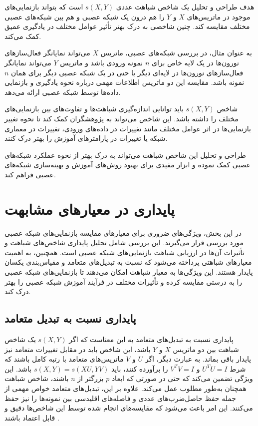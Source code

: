 هدف طراحی و تحلیل یک شاخص شباهت عددی \( s(X, Y) \) است که بتواند بازنمایی‌های%
موجود در ماتریس‌های \( X \) و \( Y \) را هم درون یک شبکه عصبی و هم بین شبکه‌های عصبی مختلف مقایسه کند. چنین شاخصی به درک بهتر تأثیر عوامل مختلف در یادگیری عمیق کمک می‌کند.

به عنوان مثال، در بررسی شبکه‌های عصبی، ماتریس \( X \) می‌تواند نمایانگر فعال‌سازهای%
نورون‌ها در یک لایه خاص برای \( n \) نمونه ورودی باشد و ماتریس \( Y \) می‌تواند نمایانگر فعال‌سازهای نورون‌ها در لایه‌ای دیگر یا حتی در یک شبکه عصبی دیگر برای همان \( n \) نمونه باشد. مقایسه این دو ماتریس اطلاعات مهمی درباره نحوه یادگیری و بازنمایی داده‌ها توسط شبکه عصبی ارائه می‌دهد.

شاخص \( s(X, Y) \) باید توانایی اندازه‌گیری شباهت‌ها و تفاوت‌های بین بازنمایی‌های مختلف را داشته باشد. این شاخص می‌تواند به پژوهشگران کمک کند تا نحوه تغییر بازنمایی‌ها در اثر عوامل مختلف مانند تغییرات در داده‌های ورودی، تغییرات در معماری شبکه یا تغییرات در پارامترهای آموزش را بهتر درک کنند.

طراحی و تحلیل این شاخص شباهت می‌تواند به درک بهتر از نحوه عملکرد شبکه‌های عصبی کمک نموده و ابزار مفیدی برای بهبود روش‌های آموزش و بهینه‌سازی شبکه‌های عصبی فراهم کند.


\section{
	پایداری در معیارهای مشابهت
}
در این بخش، ویژگی‌های ضروری برای معیارهای مقایسه بازنمایی‌های شبکه عصبی مورد بررسی قرار می‌گیرند. این بررسی شامل تحلیل پایداری شاخص‌های شباهت و تأثیرات آن‌ها در ارزیابی شباهت بازنمایی‌های شبکه عصبی است. همچنین، به اهمیت معیارهای شباهتی پرداخته می‌شود که نسبت به تبدیل‌های متعامد%
و مقیاس‌بندی یکسان%
پایدار هستند.
این ویژگی‌ها به معیار شباهت امکان می‌دهند تا بازنمایی‌های شبکه عصبی را به درستی مقایسه کرده و تأثیرات مختلف در فرآیند آموزش شبکه عصبی را بهتر درک کند.


\subsection{پایداری نسبت به تبدیل متعامد}

پایداری نسبت به تبدیل‌های متعامد به این معناست که اگر \( s(X, Y) \) یک شاخص شباهت بین دو ماتریس \( X \) و \( Y \) باشد، این شاخص باید در مقابل تغییرات متعامد نیز پایدار باقی بماند. به عبارت دیگر، اگر \( U \) و \( V \) ماتریس‌های متعامد با رتبه کامل%
باشند که شرط \( U^TU = I \) و \( V^TV = I \) را برآورده کنند، باید \( s(X, Y) = s(XU, YV) \) باشد. این ویژگی تضمین می‌کند که حتی در صورتی که ابعاد \( p \) بزرگتر از \( n \) باشند، شاخص شباهت همچنان به‌طور مطلوب عمل می‌کند. علاوه بر این، تبدیل‌های متعامد خواص مهمی از جمله حفظ حاصل‌ضرب‌های عددی و فاصله‌های اقلیدسی%
بین نمونه‌ها را نیز حفظ می‌کنند. این امر باعث می‌شود که مقایسه‌های انجام شده توسط این شاخص‌ها دقیق و قابل اعتماد باشند
\cite{kornblith2019similarity}.

